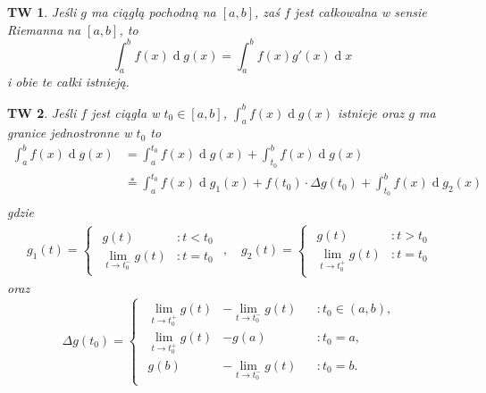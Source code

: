 \documentclass[a4paper, 12pt]{mwart}
\theoremstyle{definition}
\theoremstyle{plain}
\newtheorem{twierdzenie}{TW}[section]
\theoremstyle{remark}
\begin{document}
\vspace{20px}
\begin{twierdzenie}
	Jeśli $g$ ma ciągłą pochodną na $[a, b]$, zaś $f$ jest całkowalna w sensie Riemanna na $[a, b]$, to
	\begin{equation}
		\int_a^b f(x)\operatorname{d}\!g(x) = \int_a^b f(x)g'(x)\operatorname{d}\!x
	\end{equation}
	i obie te całki istnieją.
\end{twierdzenie}
\begin{twierdzenie}
	Jeśli $f$ jest ciągła w $t_0\in [a, b]$, $\int_a^b f(x)\operatorname{d}\!g(x)$ istnieje oraz $g$ ma granice jednostronne w $t_0$ to
	\begin{equation}
		\begin{aligned}
			\int_a^b f(x)\operatorname{d}\!g(x)
			&= \int_a^{t_0} f(x)\operatorname{d}\!g(x) + \int_{t_0}^b f(x)\operatorname{d}\!g(x) \\
			&\overset{*}{=} \int_a^{t_0} f(x)\operatorname{d}\!g_1(x) + f(t_0)\cdot\Delta g(t_0) + \int_{t_0}^b f(x)\operatorname{d}\!g_2(x) \\
		\end{aligned}
	\end{equation}
	gdzie
	\begin{equation}
		\begin{gathered}
			g_1(t) = \begin{cases}
				\begin{aligned}
					g(t) \phantom{li}&: t < t_0 \\
					\lim\limits_{t\to t_0^-} g(t) &: t = t_0
				\end{aligned}
			\end{cases}
		\!, \quad
			g_2(t) = \begin{cases}
				\begin{aligned}
					g(t) \phantom{li}&: t > t_0 \\
					\lim\limits_{t\to t_0^+} g(t) &: t = t_0
				\end{aligned}
			\end{cases}
		\end{gathered}
	\end{equation}
	oraz
	\begin{equation}
		\Delta g(t_0) = \begin{cases}
			\begin{aligned}
				\lim\limits_{t\to t_0^+} g(t) &- \lim\limits_{t\to t_0^-} g(t) &&: t_0\in (a, b), \\
				\lim\limits_{t\to t_0^+} g(t) &- g(a) &&: t_0 = a, \\
				g(b) &- \lim\limits_{t\to t_0^-} g(t) &&: t_0 = b.
			\end{aligned}
		\end{cases}
	\end{equation}
\end{twierdzenie}
\end{document}
